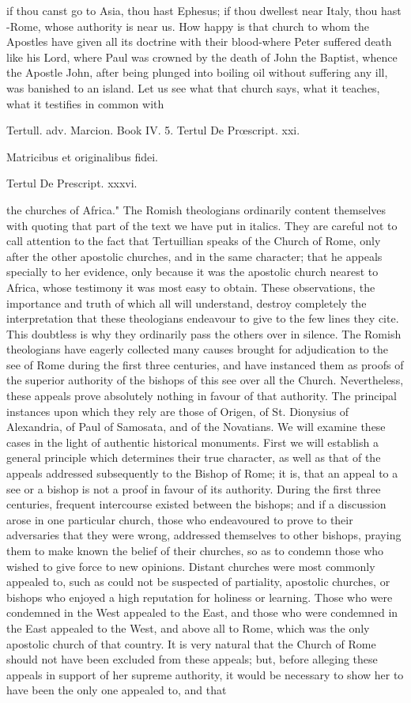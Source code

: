 if thou canst go to Asia, thou hast Ephesus; if thou dwellest near Italy, thou hast -Rome, whose authority is near us. How happy is that church to whom the Apostles have given all its doctrine with their blood-where Peter suffered death like his Lord, where Paul was crowned by the death of John the Baptist, whence the Apostle John, after being plunged into boiling oil without suffering any ill, was banished to an island. Let us see what that church says, what it teaches, what it testifies in common with

Tertull. adv. Marcion. Book IV. 5. Tertul De Prœscript. xxi.

Matricibus et originalibus fidei.

Tertul De Prescript. xxxvi.

the churches of Africa." The Romish theologians ordinarily content themselves with quoting that part of the text we have put in italics. They are careful not to call attention to the fact that Tertuillian speaks of the Church of Rome, only after the other apostolic churches, and in the same character; that he appeals specially to her evidence, only because it was the apostolic church nearest to Africa, whose testimony it was most easy to obtain. These observations, the importance and truth of which all will understand, destroy completely the interpretation that these theologians endeavour to give to the few lines they cite. This doubtless is why they ordinarily pass the others over in silence. The Romish theologians have eagerly collected many causes brought for adjudication to the see of Rome during the first three centuries, and have instanced them as proofs of the superior authority of the bishops of this see over all the Church. Nevertheless, these appeals prove absolutely nothing in favour of that authority. The principal instances upon which they rely are those of Origen, of St. Dionysius of Alexandria, of Paul of Samosata, and of the Novatians. We will examine these cases in the light of authentic historical monuments. First we will establish a general principle which determines their true character, as well as that of the appeals addressed subsequently to the Bishop of Rome; it is, that an appeal to a see or a bishop is not a proof in favour of its authority. During the first three centuries, frequent intercourse existed between the bishops; and if a discussion arose in one particular church, those who endeavoured to prove to their adversaries that they were wrong, addressed themselves to other bishops, praying them to make known the belief of their churches, so as to condemn those who wished to give force to new opinions. Distant churches were most commonly appealed to, such as could not be suspected of partiality, apostolic churches, or bishops who enjoyed a high reputation for holiness or learning. Those who were condemned in the West appealed to the East, and those who were condemned in the East appealed to the West, and above all to Rome, which was the only apostolic church of that country. It is very natural that the Church of Rome should not have been excluded from these appeals; but, before alleging these appeals in support of her supreme authority, it would be necessary to show her to have been the only one appealed to, and that 